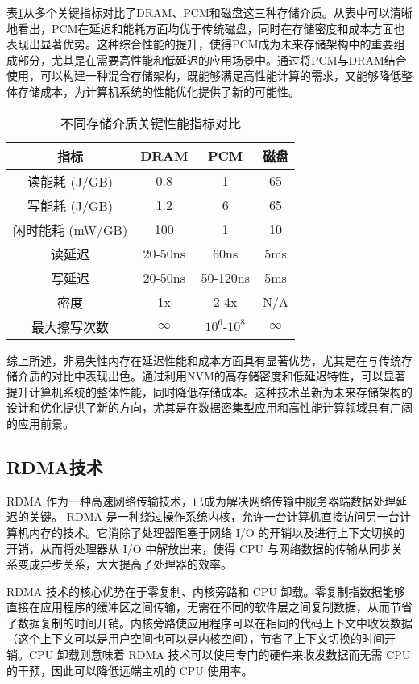 表\ref{tab:storage_comparison}从多个关键指标对比了DRAM、PCM和磁盘这三种存储介质。从表中可以清晰地看出，PCM在延迟和能耗方面均优于传统磁盘，同时在存储密度和成本方面也表现出显著优势。这种综合性能的提升，使得PCM成为未来存储架构中的重要组成部分，尤其是在需要高性能和低延迟的应用场景中。通过将PCM与DRAM结合使用，可以构建一种混合存储架构，既能够满足高性能计算的需求，又能够降低整体存储成本，为计算机系统的性能优化提供了新的可能性。

\begin{table}[h]
    \centering
    \caption{不同存储介质关键性能指标对比}
    \label{tab:storage_comparison}
    \begin{tabular}{cccc}
    \toprule
    指标       & DRAM     & PCM      & 磁盘      \\
    \midrule
    读能耗 (J/GB) & 0.8      & 1        & 65       \\
    写能耗 (J/GB) & 1.2      & 6        & 65       \\
    闲时能耗 (mW/GB) & 100      & 1        & 10       \\
    读延迟     & 20-50ns   & 60ns      & 5ms       \\
    写延迟     & 20-50ns   & 50-120ns  & 5ms       \\
    密度       & 1x       & 2-4x     & N/A      \\
    最大擦写次数   & $\infty$ & $10^6$-$10^8$ & $\infty$ \\
    \bottomrule
    \end{tabular}
    \end{table}
综上所述，非易失性内存在延迟性能和成本方面具有显著优势，尤其是在与传统存储介质的对比中表现出色。通过利用NVM的高存储密度和低延迟特性，可以显著提升计算机系统的整体性能，同时降低存储成本。这种技术革新为未来存储架构的设计和优化提供了新的方向，尤其是在数据密集型应用和高性能计算领域具有广阔的应用前景。

\subsection{RDMA技术}

 RDMA 作为一种高速网络传输技术，已成为解决网络传输中服务器端数据处理延迟的关键。 RDMA 是一种绕过操作系统内核，允许一台计算机直接访问另一台计算机内存的技术。它消除了处理器阻塞于网络 I/O 的开销以及进行上下文切换的开销，从而将处理器从 I/O 中解放出来，使得 CPU 与网络数据的传输从同步关系变成异步关系，大大提高了处理器的效率。

 RDMA 技术的核心优势在于零复制、内核旁路和 CPU 卸载。零复制指数据能够直接在应用程序的缓冲区之间传输，无需在不同的软件层之间复制数据，从而节省了数据复制的时间开销。内核旁路使应用程序可以在相同的代码上下文中收发数据（这个上下文可以是用户空间也可以是内核空间），节省了上下文切换的时间开销。CPU 卸载则意味着 RDMA 技术可以使用专门的硬件来收发数据而无需 CPU 的干预，因此可以降低远端主机的 CPU 使用率。

